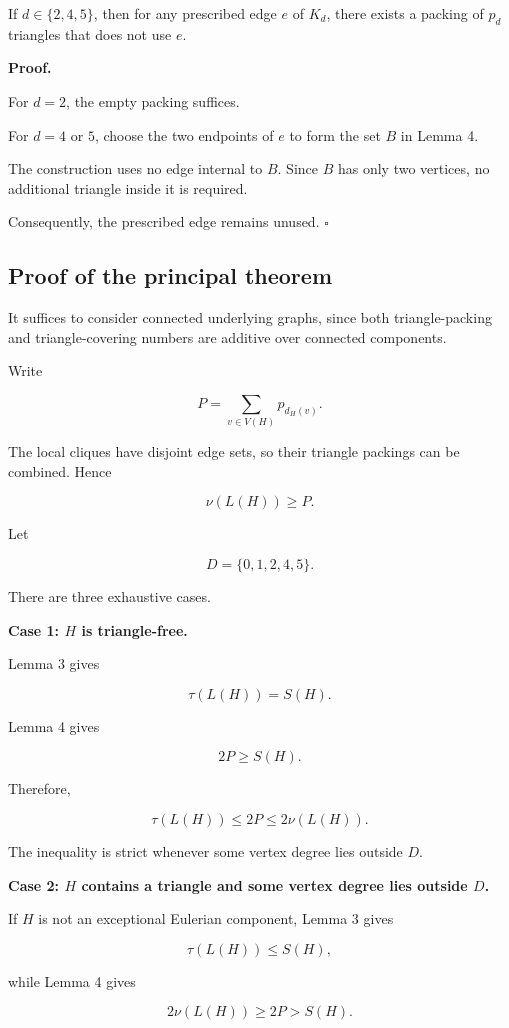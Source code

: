 \documentclass[11pt]{article}
\begin{document}
If \(d\in\{2,4,5\}\), then for any prescribed edge \(e\) of \(K_d\), there exists a packing of \(p_d\) triangles that does not use \(e\).

\textbf{Proof.}

For \(d=2\), the empty packing suffices.

For \(d=4\) or \(5\), choose the two endpoints of \(e\) to form the set \(B\) in Lemma 4.

The construction uses no edge internal to \(B\). Since \(B\) has only two vertices, no additional triangle inside it is required.

Consequently, the prescribed edge remains unused. \(\square\)

\subsection{Proof of the principal theorem}

It suffices to consider connected underlying graphs, since both triangle-packing and triangle-covering numbers are additive over connected components.

Write

\[
P=\sum_{v\in V(H)}p_{d_H(v)}.
\]

The local cliques have disjoint edge sets, so their triangle packings can be combined. Hence

\[
\nu(L(H))\geq P.
\]

Let

\[
D=\{0,1,2,4,5\}.
\]

There are three exhaustive cases.

\textbf{Case 1: \(H\) is triangle-free.}

Lemma 3 gives

\[
\tau(L(H))=S(H).
\]

Lemma 4 gives

\[
2P\geq S(H).
\]

Therefore,

\[
\tau(L(H))\leq2P\leq2\nu(L(H)).
\]

The inequality is strict whenever some vertex degree lies outside \(D\).

\textbf{Case 2: \(H\) contains a triangle and some vertex degree lies outside \(D\).}

If \(H\) is not an exceptional Eulerian component, Lemma 3 gives

\[
\tau(L(H))\leq S(H),
\]

while Lemma 4 gives

\[
2\nu(L(H))\geq2P>S(H).
\]
\end{document}
